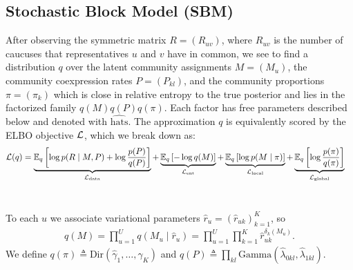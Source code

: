 \documentclass{article}
\begin{document}
\subsection{Stochastic Block Model (SBM)}
\label{sbmvi}

After observing the symmetric matrix $R = (R_{uv})$, where $R_{uv}$ is the number of caucuses that representatives $u$ and $v$ have in common, we see to find a distribution $q$ over the latent community assignments $M = (M_u)$, the community coexpression rates $P = (P_{kl})$, and the community proportions $\pi = (\pi_k)$ which is close in relative entropy to the true posterior and lies in the factorized family $q(M)q(P)q(\pi)$. Each factor has free parameters described below and denoted with $\widehat{\text{hats}}$. The approximation $q$ is equivalently scored by the ELBO objective $\mathcal{L}$, which we break down as:%
\begin{equation*}
\begin{split}
\mathcal{L}(q)
&= \underbrace{\mathbb{E}_q\left[\log p(R\mid M,P)+ \log\frac{p(P)}{q(P)}\right]}_{\mathcal{L}_{\text{data}}}
+ \underbrace{\mathbb{E}_q\left[-\log q(M)\right]}_{\mathcal{L}_{\text{ent}}}
+ \underbrace{\mathbb{E}_q\left[\log p(M\mid \pi)\right]}_{\mathcal{L}_{\text{local}}}
+ \underbrace{\mathbb{E}_q\left[\log\frac{p(\pi)}{q(\pi)}\right]}_{\mathcal{L}_{\text{global}}}
\end{split}
\end{equation*}
~\vspace{-1em}

 To each $u$ we associate variational parameters $\widehat r_u = \left(\widehat r_{uk}\right)_{k=1}^K$, so
\begin{align}
q(M) = \prod_{u=1}^U q(M_u\mid \widehat r_u) 
= \prod_{u=1}^U \prod_{k=1}^K \widehat r_{uk}^{\delta_k(M_u)}.
\end{align}
We define 
$q(\pi) \triangleq \text{Dir}(\widehat \gamma_1, \dots, \widehat \gamma_K)$ and $q(P) \triangleq \prod_{kl}\text{Gamma}(\widehat \lambda_{0kl},\widehat \lambda_{1kl})$. %
\end{document}
